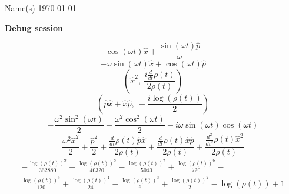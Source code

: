 \documentclass[12pt]{article}
\begin{document}
\noindent Name(s) \hfill \today \\[30pt]
\centerline{ \Large{ \textbf{ Debug session}}}
\begin{equation}
	\cos{\left(\omega t \right)} \hat{x} + \frac{\sin{\left(\omega t \right)} \hat{p}}{\omega}
\end{equation}
\begin{equation*}
	- \omega \sin{\left(\omega t \right)} \hat{x} + \cos{\left(\omega t \right)} \hat{p}
\end{equation*}
\begin{equation*}
	\left( \hat{x}^{2}, \  \frac{i \frac{d}{d t} \rho{\left(t \right)}}{2 \rho{\left(t \right)}}\right)
\end{equation*}
\begin{equation*}
	\left( \hat{p} \hat{x} + \hat{x} \hat{p}, \  - \frac{i \log{\left(\rho{\left(t \right)} \right)}}{2}\right)
\end{equation*}
\begin{equation*}
	- \frac{\omega^{2} \sin^{2}{\left(\omega t \right)}}{2} + \frac{\omega^{2} \cos^{2}{\left(\omega t \right)}}{2} - i \omega \sin{\left(\omega t \right)} \cos{\left(\omega t \right)}
\end{equation*}
\begin{equation*}
	\frac{\omega^{2} \hat{x}^{2}}{2} + \frac{\hat{p}^{2}}{2} + \frac{\frac{d}{d t} \rho{\left(t \right)} \hat{p} \hat{x}}{2 \rho{\left(t \right)}} + \frac{\frac{d}{d t} \rho{\left(t \right)} \hat{x} \hat{p}}{2 \rho{\left(t \right)}} + \frac{\frac{d^{2}}{d t^{2}} \rho{\left(t \right)} \hat{x}^{2}}{2 \rho{\left(t \right)}}
\end{equation*}
\begin{align*}
	- \frac{\log{\left(\rho{\left(t \right)} \right)}^{9}}{362880} + \frac{\log{\left(\rho{\left(t \right)} \right)}^{8}}{40320} - \frac{\log{\left(\rho{\left(t \right)} \right)}^{7}}{5040} + \frac{\log{\left(\rho{\left(t \right)} \right)}^{6}}{720} - \\
	\frac{\log{\left(\rho{\left(t \right)} \right)}^{5}}{120} + \frac{\log{\left(\rho{\left(t \right)} \right)}^{4}}{24} - \frac{\log{\left(\rho{\left(t \right)} \right)}^{3}}{6} + \frac{\log{\left(\rho{\left(t \right)} \right)}^{2}}{2} - \log{\left(\rho{\left(t \right)} \right)} + 1
\end{align*}
{} %

\end{document}
